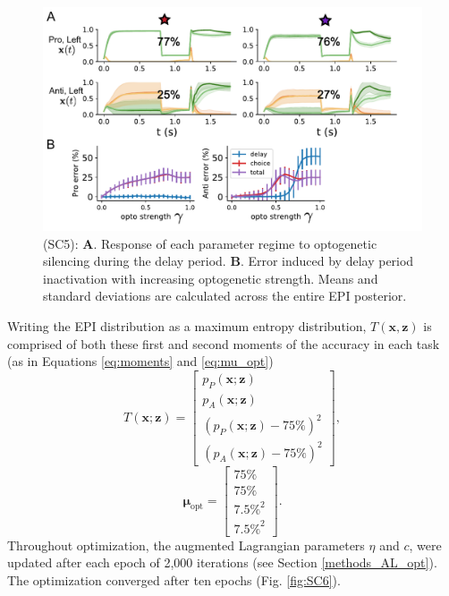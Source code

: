 \documentclass[11pt]{article}
\begin{document}
\begin{figure}
\begin{center}
\includegraphics[scale=0.8]{figures/figSC5/figSC5.pdf}
\end{center}
\caption{\small (SC5): 
\textbf{A}. Response of each parameter regime to optogenetic silencing during the delay period.
\textbf{B}. Error induced by delay period inactivation with increasing optogenetic strength.  Means and standard deviations are calculated across the entire EPI posterior.
}
\label{fig:SC5}
\end{figure}

Writing the EPI distribution as a maximum entropy distribution, $T(\mathbf{x}, \mathbf{z})$ is comprised of both these first and second moments of the accuracy in each task (as in Equations \ref{eq:moments} and \ref{eq:mu_opt})
\begin{equation} 
T(\mathbf{x}; \mathbf{z}) = \begin{bmatrix} p_P(\mathbf{x}; \mathbf{z}) \\ p_A(\mathbf{x}; \mathbf{z}) \\ \left(p_P(\mathbf{x}; \mathbf{z}) - 75\% \right)^2 \\ \left(p_A(\mathbf{x}; \mathbf{z}) - 75\% \right)^2 \end{bmatrix},
\end{equation}
\begin{equation} 
\bm{\mu}_{\text{opt}} = \begin{bmatrix} 75\% \\ 75\% \\ 7.5\%^2 \\ 7.5\%^2 \end{bmatrix}.
\end{equation}
Throughout optimization, the augmented Lagrangian parameters $\eta$ and $c$, were updated after each epoch of 2,000 iterations (see Section \ref{methods_AL_opt}).  
The optimization converged after ten epochs (Fig. \ref{fig:SC6}).
\end{document}

